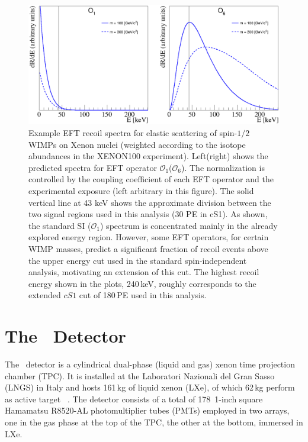 \begin{figure}[t!]
\centerline{\includegraphics[width=1.\linewidth]{Figures/drdeO1O6.eps}}
\caption{Example EFT recoil spectra for elastic scattering of spin-$1/2$ WIMPs on Xenon nuclei (weighted according to the isotope abundances in the XENON100 experiment). Left(right) shows the predicted spectra for EFT operator $\mathcal{O}_1$($\mathcal{O}_6$). The normalization is controlled by the coupling coefficient of each EFT operator and the experimental exposure (left arbitrary in this figure). The solid vertical line at 43 keV shows the approximate division between the two signal regions used in this analysis (30 PE in cS1). As shown, the standard SI ($\mathcal{O}_1$) spectrum is concentrated mainly in the already explored energy region. However, some EFT operators, for certain WIMP masses, predict a significant fraction of recoil events above the upper energy cut used in the standard spin-independent analysis, motivating an extension of this cut. The highest recoil energy shown in the plots, 240\,keV, roughly corresponds to the extended $cS1$ cut of 180\,PE used in this analysis.}
\label{fig:dRdE}
\end{figure}

\section{The \Xehund\  Detector}
The \Xehund\ detector is a cylindrical %
dual-phase (liquid and gas) xenon time projection chamber (TPC). It is installed at the Laboratori Nazionali del Gran Sasso (LNGS) in Italy
and hosts 161\,kg of liquid xenon (LXe), of which 62\,kg perform as active target ~\cite{xe100_instr2012}. 
The detector consists of a total of 178~1-inch square Hamamatsu R8520-AL photomultiplier tubes (PMTs) employed in two arrays, one in the gas phase at the top of the TPC,
the other at the bottom, immersed in LXe. 

